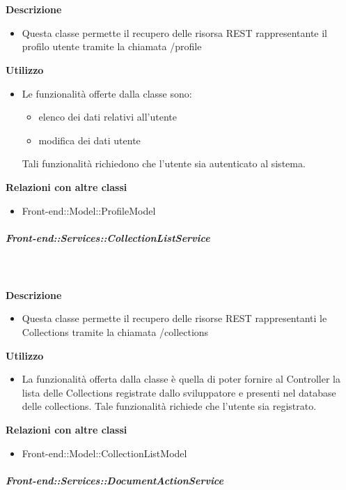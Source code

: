         \textbf{\\ \\ Descrizione} 
          \begin{itemize}
            \item[] Questa classe permette il recupero delle risorsa REST rappresentante il profilo utente tramite la chiamata /profile
          \end{itemize}      
        \textbf{Utilizzo}  
          \begin{itemize}
            \item[] Le funzionalità offerte dalla classe sono:
\begin{itemize}
\item elenco dei dati relativi all'utente
\item modifica dei dati utente
\end{itemize}

Tali funzionalità richiedono che l'utente sia autenticato al sistema.
          \end{itemize}
          \textbf{Relazioni con altre classi}
          \begin{itemize}
              \item{Front-end::Model::ProfileModel}
          \end{itemize}
      \subparagraph{Front-end::Services::CollectionListService}
        
        \textbf{\\ \\ Descrizione} 
          \begin{itemize}
            \item[] Questa classe permette il recupero delle risorse REST rappresentanti le Collections tramite la chiamata /collections
          \end{itemize}      
        \textbf{Utilizzo}  
          \begin{itemize}
            \item[] La funzionalità offerta dalla classe è quella di poter fornire al Controller la lista delle Collections registrate dallo sviluppatore e presenti nel database delle collections.
Tale funzionalità richiede che l'utente sia registrato.
          \end{itemize}
          \textbf{Relazioni con altre classi}
          \begin{itemize}
              \item{Front-end::Model::CollectionListModel}
          \end{itemize}
      \subparagraph{Front-end::Services::DocumentActionService}
        
